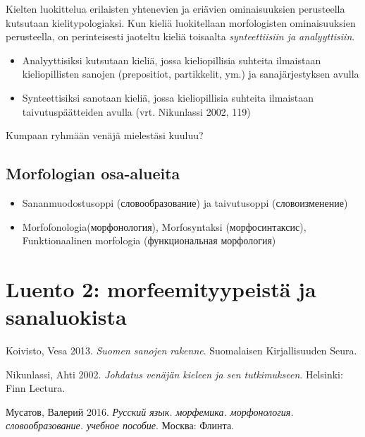 Kielten luokittelua erilaisten yhtenevien ja eriävien ominaisuuksien
perusteella kutsutaan kielitypologiaksi. Kun kieliä luokitellaan
morfologisten ominaisuuksien perusteella, on perinteisesti jaoteltu
kieliä toisaalta \emph{synteettiisiin ja analyyttisiin}.

\begin{itemize}
\itemsep1pt\parskip0pt
\item
  Analyyttisiksi kutsutaan kieliä, jossa kieliopillisia suhteita
  ilmaistaan kieliopillisten sanojen (prepositiot, partikkelit, ym.) ja
  sanajärjestyksen avulla
\item
  Synteettisiksi sanotaan kieliä, jossa kieliopillisia suhteita
  ilmaistaan taivutuspäätteiden avulla (vrt. Nikunlassi 2002, 119)
\end{itemize}

Kumpaan ryhmään venäjä mielestäsi kuuluu?

\subsection{Morfologian osa-alueita}\label{morfologian-osa-alueita}

\begin{itemize}
\item
  Sananmuodostusoppi (словообразование) ja taivutusoppi (словоизменение)
\item
  Morfofonologia(морфонология), Morfosyntaksi (морфосинтаксис),
  Funktionaalinen morfologia (функциональная морфология)
\end{itemize}

\section*{Luento 2: morfeemityypeistä ja
sanaluokista}\label{luento-2-morfeemityypeistuxe4-ja-sanaluokista}

Koivisto, Vesa 2013. \emph{Suomen sanojen rakenne}. Suomalaisen
Kirjallisuuden Seura.

Nikunlassi, Ahti 2002. \emph{Johdatus venäjän kieleen ja sen
tutkimukseen}. Helsinki: Finn Lectura.

Мусатов, Валерий 2016. \emph{Русский язык. морфемика. морфонология.
словообразование. учебное пособие}. Москва: Флинта.

